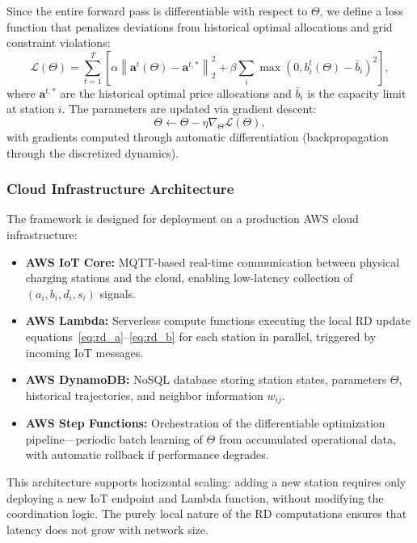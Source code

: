 \documentclass[review]{elsarticle}
\begin{document}
\hspace{0.5cm}Since the entire forward pass is differentiable with respect to $\Theta$, we define a loss function that penalizes deviations from historical optimal allocations and grid constraint violations:
\begin{equation}
    \mathcal{L}(\Theta) = \sum_{t=1}^{T} \left[ \alpha \left\| \mathbf{a}^t(\Theta) - \mathbf{a}^{t,*} \right\|_2^2 + \beta \sum_{i} \max\left(0, b_i^t(\Theta) - \bar{b}_i\right)^2 \right],
    \label{eq:loss}
\end{equation}
where $\mathbf{a}^{t,*}$ are the historical optimal price allocations and $\bar{b}_i$ is the capacity limit at station $i$. The parameters are updated via gradient descent:
\begin{equation}
    \Theta \leftarrow \Theta - \eta \nabla_\Theta \mathcal{L}(\Theta),
    \label{eq:gradient}
\end{equation}
with gradients computed through automatic differentiation (backpropagation through the discretized dynamics).

\subsubsection{Cloud Infrastructure Architecture}

\hspace{0.5cm}The framework is designed for deployment on a production AWS cloud infrastructure:

\begin{itemize}
    \item \textbf{AWS IoT Core:} MQTT-based real-time communication between physical charging stations and the cloud, enabling low-latency collection of $(a_i, b_i, d_i, s_i)$ signals.
    \item \textbf{AWS Lambda:} Serverless compute functions executing the local RD update equations~\eqref{eq:rd_a}--\eqref{eq:rd_b} for each station in parallel, triggered by incoming IoT messages.
    \item \textbf{AWS DynamoDB:} NoSQL database storing station states, parameters $\Theta$, historical trajectories, and neighbor information $w_{ij}$.
    \item \textbf{AWS Step Functions:} Orchestration of the differentiable optimization pipeline---periodic batch learning of $\Theta$ from accumulated operational data, with automatic rollback if performance degrades.
\end{itemize}

\hspace{0.5cm}This architecture supports horizontal scaling: adding a new station requires only deploying a new IoT endpoint and Lambda function, without modifying the coordination logic. The purely local nature of the RD computations ensures that latency does not grow with network size.
\end{document}
